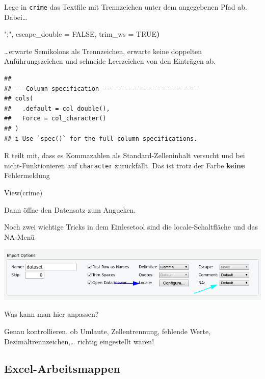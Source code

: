 \documentclass[
]{book}
\newenvironment{Shaded}{\begin{snugshade}}{\end{snugshade}}
\newcommand{\ConstantTok}[1]{\textcolor[rgb]{0.00,0.00,0.00}{#1}}
\newcommand{\ErrorTok}[1]{\textcolor[rgb]{0.64,0.00,0.00}{\textbf{#1}}}
\newcommand{\FunctionTok}[1]{\textcolor[rgb]{0.00,0.00,0.00}{#1}}
\newcommand{\NormalTok}[1]{#1}
\newcommand{\OtherTok}[1]{\textcolor[rgb]{0.56,0.35,0.01}{#1}}
\newcommand{\StringTok}[1]{\textcolor[rgb]{0.31,0.60,0.02}{#1}}
\begin{document}
Lege in \texttt{crime} das Textfile mit Trennzeichen unter dem angegebenen Pfad ab. Dabei\ldots{}

\begin{Shaded}
\begin{Highlighting}[]
\StringTok{";"}\NormalTok{, escape\_double }\OtherTok{=} \ConstantTok{FALSE}\NormalTok{, trim\_ws }\OtherTok{=} \ConstantTok{TRUE}\ErrorTok{)}
\end{Highlighting}
\end{Shaded}

\ldots erwarte Semikolons als Trennzeichen, erwarte keine doppelten Anführungszeichen und schneide Leerzeichen von den Einträgen ab.

\begin{verbatim}
## 
## -- Column specification --------------------------
## cols(
##   .default = col_double(),
##   Force = col_character()
## )
## i Use `spec()` for the full column specifications.
\end{verbatim}

R teilt mit, dass es Kommazahlen als Standard-Zelleninhalt versucht und bei nicht-Funktionieren auf \texttt{character} zurückfällt. Das ist trotz der Farbe \textbf{keine} Fehlermeldung

\begin{Shaded}
\begin{Highlighting}[]
\FunctionTok{View}\NormalTok{(crime)}
\end{Highlighting}
\end{Shaded}

Dann öffne den Datensatz zum Angucken.

Noch zwei wichtige Tricks in dem Einlesetool sind die locale-Schaltfläche und das NA-Menü

\begin{center}\includegraphics[width=0.8\linewidth]{imgs/text4} \end{center}

Was kann man hier anpassen?

Genau kontrollieren, ob Umlaute, Zellentrennung, fehlende Werte, Dezimaltrennzeichen,\ldots{} richtig eingestellt waren!

\hypertarget{excel-arbeitsmappen}{%
\subsection{Excel-Arbeitsmappen}\label{excel-arbeitsmappen}}
\end{document}
